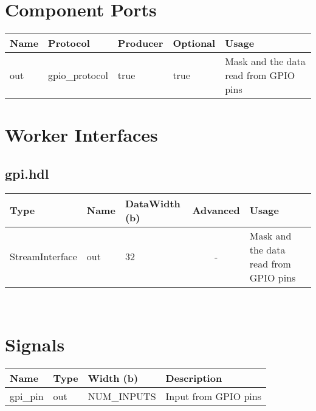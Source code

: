 \begin{landscape}
\begin{flushleft}
\end{flushleft}

 
\section*{Component Ports}

        \begin{scriptsize}
                \begin{tabular}{|M{2.5cm}|M{2cm}|M{2cm}|M{3cm}|M{11cm}|}
                        \hline
                        Name & Protocol & Producer & Optional & Usage\\
                        \hline
                        out
                        & gpio\_protocol
                        & true
                        & true
                        & Mask and the data read from GPIO pins \\
                        \hline
                \end{tabular}
			\end{scriptsize}
			
\section*{Worker Interfaces}
\subsection*{gpi.hdl}
\begin{scriptsize}
\begin{tabular}{|M{5cm}|M{4cm}|M{4cm}|c|M{6.5cm}|M{6cm}|}
            \hline
            Type    & Name & DataWidth (b) & Advanced  & Usage     \\
            \hline
            StreamInterface & out   & 32  & - & Mask and the data read from GPIO pins \\
           \hline

\end{tabular}
\end{scriptsize} \\

	
\section*{Signals}
	\begin{scriptsize}
		\begin{tabular}{|M{2.5cm}|M{3cm}|M{6.5cm}|M{9.2cm}|}
			\hline
			Name         & Type   & Width (b) & Description                       \\
			\hline
			gpi\_pin    & out & NUM\_INPUTS & Input from GPIO pins            \\
			\hline
		\end{tabular}
	\end{scriptsize}
\end{landscape}

